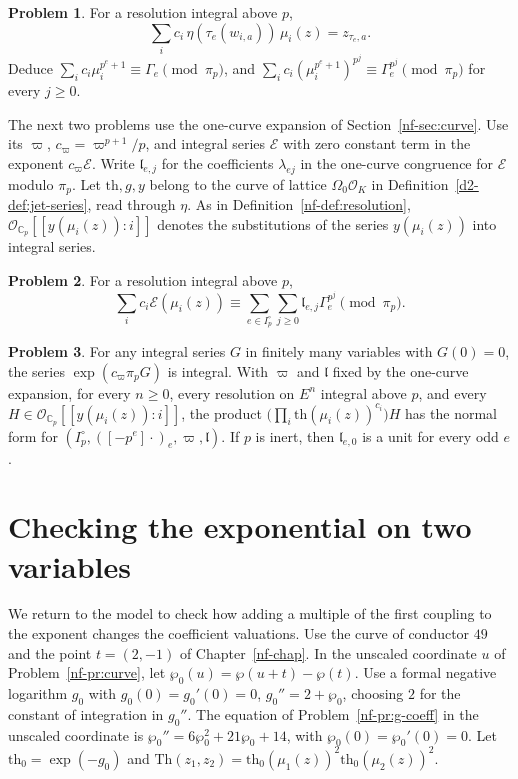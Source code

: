 \documentclass[reqno]{amsart}
\newcounter{chap}
\theoremstyle{plain}
\theoremstyle{definition}
\newtheorem{problem}{Problem}[section]
\theoremstyle{remark}
\newcommand{\C}{\mathbb C}
\newcommand{\Oc}{\mathcal O}
\newcommand{\Op}{\mathcal O_{\C_p}}
\newcommand{\tth}{\mathrm{th}}
\newcommand{\Thm}{\mathrm{Th}}
\begin{document}
\begin{problem}\label{pr:coupling-congruence}
For a resolution integral above \(p\),
\[
 \sum_i c_i\,\eta(\tau_e(w_{i,a}))\,\mu_i(z)=z_{\tau_e,a}.
\]
Deduce \(\sum_i c_i\mu_i^{p^e+1}\equiv\Gamma_e\pmod{\pi_p}\), and \(\sum_i c_i(\mu_i^{p^e+1})^{p^j}\equiv\Gamma_e^{p^j}\pmod{\pi_p}\) for every \(j\ge0\).
\end{problem}

The next two problems use the one-curve expansion of Section~\ref{nf-sec:curve}.  Use its \(\varpi\), \(c_\varpi=\varpi^{p+1}/p\), and integral series \(\mathcal E\) with zero constant term in the exponent \(c_\varpi\mathcal E\).  Write \(\mathfrak l_{e,j}\) for the coefficients \(\lambda_{ej}\) in the one-curve congruence for \(\mathcal E\) modulo \(\pi_p\).  Let \(\tth,g,y\) belong to the curve of lattice \(\Omega_0\Oc_K\) in Definition~\ref{d2-def:jet-series}, read through \(\eta\).  As in Definition~\ref{nf-def:resolution}, \(\Op[[y(\mu_i(z)) : i]]\) denotes the substitutions of the series \(y(\mu_i(z))\) into integral series.

\begin{problem}\label{pr:exponent}
For a resolution integral above \(p\),
\[
 \sum_i c_i\mathcal E(\mu_i(z))\equiv
    \sum_{e\in I_p^\circ}\sum_{j\ge0}\mathfrak l_{e,j}\Gamma_e^{p^j}\pmod{\pi_p}.
\]
\end{problem}

\begin{problem}\label{pr:products}
For any integral series \(G\) in finitely many variables with \(G(0)=0\), the series \(\exp(c_\varpi\pi_p G)\) is integral.  With \(\varpi\) and \(\mathfrak l\) fixed by the one-curve expansion, for every \(n\ge0\), every resolution on \(E^n\) integral above \(p\), and every \(H\in\Op[[y(\mu_i(z)):i]]\), the product \(\bigl(\prod_i\tth(\mu_i(z))^{c_i}\bigr)H\) has the normal form for \((I_p^\circ,([-p^e]\cdot)_e,\varpi,\mathfrak l)\).  If \(p\) is inert, then \(\mathfrak l_{e,0}\) is a unit for every odd \(e\).
\end{problem}

\section{Checking the exponential on two variables}\label{sec:check}

We return to the model to check how adding a multiple of the first coupling to the exponent changes the coefficient valuations.  Use the curve of conductor \(49\) and the point \(t=(2,-1)\) of Chapter~\ref{nf-chap}.  In the unscaled coordinate \(u\) of Problem~\ref{nf-pr:curve}, let \(\wp_0(u)=\wp(u+t)-\wp(t)\).  Use a formal negative logarithm \(g_0\) with \(g_0(0)=g_0'(0)=0\), \(g_0''=2+\wp_0\), choosing \(2\) for the constant of integration in \(g_0''\).  The equation of Problem~\ref{nf-pr:g-coeff} in the unscaled coordinate is \(\wp_0''=6\wp_0^2+21\wp_0+14\), with \(\wp_0(0)=\wp_0'(0)=0\).  Let \(\tth_0=\exp(-g_0)\) and \(\Thm(z_1,z_2)=\tth_0(\mu_1(z))^2\tth_0(\mu_2(z))^2\).
\end{document}
